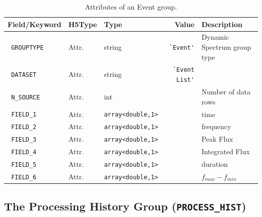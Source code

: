 \documentclass[a4paper,10pt,bibtotoc]{scrartcl}
\begin{document}
\begin{table}[ht]
  \centering
  \begin{tabular}{|lllrl|}
    \hline
    \sc Field/Keyword &  \sc H5Type   & \sc Type      & \sc Value & \sc Description\\
    \hline \hline                    
    \small{\verb| GROUPTYPE|} & Attr. & string & \verb|`Event'| & Dynamic Spectrum group type \\
    \small{\verb| DATASET|}   & Attr. & string & \verb|`Event List'|   &  \\
    \small{\verb| N_SOURCE|}  & Attr. & int    &                 & Number of data rows \\
    \small{\verb| FIELD_1|}   & Attr. & \verb|array<double,1>| &               & time \\
    \small{\verb| FIELD_2|}   & Attr. & \verb|array<double,1>| &               & frequency \\
    \small{\verb| FIELD_3|}   & Attr. & \verb|array<double,1>| &               & Peak Flux \\
    \small{\verb| FIELD_4|}   & Attr. & \verb|array<double,1>| &               & Integrated Flux \\
    \small{\verb| FIELD_5|}   & Attr. & \verb|array<double,1>| &               & duration \\
    \small{\verb| FIELD_6|}   & Attr. & \verb|array<double,1>| &               & $f_{max}-f_{min}$ \\
    \hline
  \end{tabular}
  \caption{Attributes of an Event group.}
  \label{tab:attributes event group}
\end{table}


\subsection{The Processing History Group ({\tt PROCESS\_HIST})}
\label{sec:processing group}
\end{document}
